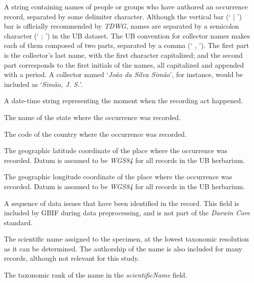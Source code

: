 \begin{description}[align=left,labelindent=1cm]
\item [recordedBy.] A string containing names of people or groups who have authored an occurrence record, separated by some delimiter character.
Although the vertical bar (` | ') bar is officially recommended by \textit{TDWG}, names are separated by a semicolon character (` ; ') in the UB dataset. 
The UB convention for collector names makes each of them composed of two parts, separated by a comma (` , ').
The first part is the collector's last name, with the first character capitalized; and the second part corresponds to the first initials of the names, all capitalized and appended with a period.
A collector named `\textit{João da Silva Simão}', for instance, would be included as `\textit{Simão, J. S.}'.
%
\item [eventDate.] A date-time string representing the moment when the recording act happened.
%
\item [stateProvince.] The name of the state where the occurrence was recorded.

\item [countryCode.] The code of the country where the occurrence was recorded.

\item [decimalLatitude.] The geographic latitude coordinate of the place where the occurrence was recorded. 
Datum is assumed to be \textit{WGS84} for all records in the UB herbarium.

\item [decimalLongitude.] The geographic longitude coordinate of the place where the occurrence was recorded.
Datum is assumed to be \textit{WGS84} for all records in the UB herbarium.

\item [issue.] A sequence of data issues that have been identified in the record.
This field is included by GBIF during data preprocessing, and is not part of the \textit{Darwin Core} standard.%

\item [scientificName.] The scientific name assigned to the specimen, at the lowest taxonomic resolution as it can be determined. The authorship of the name is also included for many records, although not relevant for this study.

\item [taxonRank.] The taxonomic rank of the name in the \textit{scientificName} field.
\end{description}

